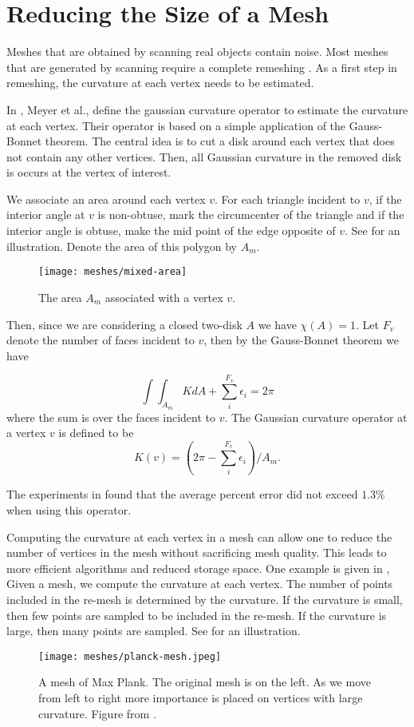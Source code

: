 \section{Reducing the Size of a Mesh}
\label{sec:removing}



Meshes that are obtained by scanning real objects contain noise.
Most meshes that are generated by scanning require a complete
remeshing \cite{remeshing-2003}.
As a first step in remeshing, the curvature at each
vertex needs to be estimated.

In \cite{mmsb-2003}, Meyer et al., define the gaussian curvature operator
to estimate the curvature at each vertex. Their operator is 
based on a simple application of the Gauss-Bonnet theorem.
The central idea is to cut a disk around each vertex that does not contain
any other vertices. Then, all Gaussian curvature in the removed
disk is occurs at the vertex of interest.

We associate an area around each vertex $v$. 
For each triangle incident to $v$, if the interior 
angle at $v$ is non-obtuse, mark the circumcenter of the triangle
and if the interior angle is obtuse, make the mid point of the edge
opposite of $v$. See  for an illustration.
Denote the area of this polygon by $A_m.$


\begin{figure}[htb]
\centering
\texttt{[image: meshes/mixed-area]}
\caption{The area $A_m$ associated with a vertex $v$.}
\label{fig:mixed-area}
\end{figure}


Then, since we are considering a closed two-disk $A$ we have $\chi(A)=1$.
Let $F_v$ denote the number of faces incident to $v$, 
then by the Gauss-Bonnet theorem we have

$$\int \int_{A_m}K dA +\sum_i^{F_v} \epsilon_i=2\pi$$
where the sum is over the faces incident to $v$.
The Gaussian curvature operator at a vertex $v$ is defined
to be
$$K(v)=\left( 2\pi -\sum_i^{F_v}\epsilon_i\right)/ A_m.$$

The experiments in \cite{mmsb-2003} found that the average
percent error did not exceed $1.3\%$ when using this operator.

Computing the curvature at each vertex in a mesh can allow one to reduce
the number of vertices in the mesh without sacrificing mesh quality.
This leads to more efficient algorithms and reduced storage space.
One example is given in \cite{alliez-2002},
Given a mesh, we compute the curvature at each vertex.
The number of points included in the re-mesh is determined
by the curvature. If the curvature is small, then few points
are sampled to be included in the re-mesh. If the curvature
is large, then many points are sampled. See 
for an illustration.

\begin{figure}[htb]
\centering
\texttt{[image: meshes/planck-mesh.jpeg]}
\caption{A mesh of Max Plank. The original mesh is on the left. As we move
from left to right more importance is placed on vertices with large curvature.
Figure from \cite{alliez-2002}.}
\label{fig:planck-mesh}
\end{figure}